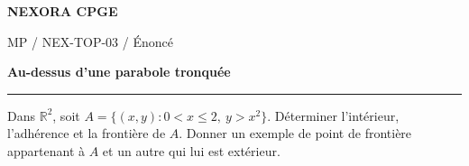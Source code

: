 \documentclass[11pt,a4paper]{article}
\begin{document}
{\small\bfseries\color{nexorablue} NEXORA CPGE}\par
{\small MP / NEX-TOP-03 / Énoncé}\par
{\LARGE\bfseries Au-dessus d’une parabole tronquée}\par
\vspace{0.25em}\hrule\vspace{0.6em}

Dans $\mathbb R^2$, soit $A=\{(x,y):0<x\le2,\ y>x^2\}$. Déterminer l’intérieur, l’adhérence et la frontière de $A$. Donner un exemple de point de frontière appartenant à $A$ et un autre qui lui est extérieur.
\end{document}
